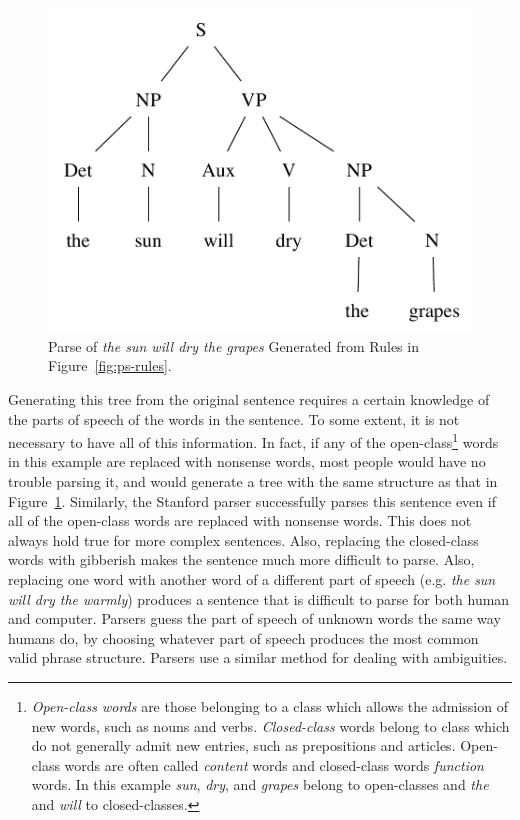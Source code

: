 \documentclass[main.tex]{subfiles}
\begin{document}
\begin{figure}[htbp]
\centering
\includegraphics[scale=0.6]{ps-tree.pdf}
\caption{Parse of \textit{the sun will dry the grapes} Generated from Rules in Figure~\ref{fig:ps-rules}.}
\label{fig:ps-tree}
\end{figure}
Generating this tree from the original sentence requires a certain knowledge of the parts of speech of the words in the sentence. To some extent, it is not necessary to have all of this information. In fact, if any of the open-class\footnote{\textit{Open-class words} are those belonging to a class which allows the admission of new words, such as nouns and verbs. \textit{Closed-class} words belong to class which do not generally admit new entries, such as prepositions and articles. Open-class words are often called \textit{content} words and closed-class words \textit{function} words. In this example \textit{sun}, \textit{dry}, and \textit{grapes} belong to open-classes and \textit{the} and \textit{will} to closed-classes.} words in this example are replaced with nonsense words, most people would have no trouble parsing it, and would generate a tree with the same structure as that in Figure~\ref{fig:ps-tree}. Similarly, the Stanford parser successfully parses this sentence even if all of the open-class words are replaced with nonsense words. This does not always hold true for more complex sentences. Also, replacing the closed-class words with gibberish makes the sentence much more difficult to parse. Also, replacing one word with another word of a different part of speech (e.g. \textit{the sun will dry the warmly}) produces a sentence that is difficult to parse for both human and computer. Parsers guess the part of speech of unknown words the same way humans do, by choosing whatever part of speech produces the most common valid phrase structure. Parsers use a similar method for dealing with ambiguities.
\end{document}
